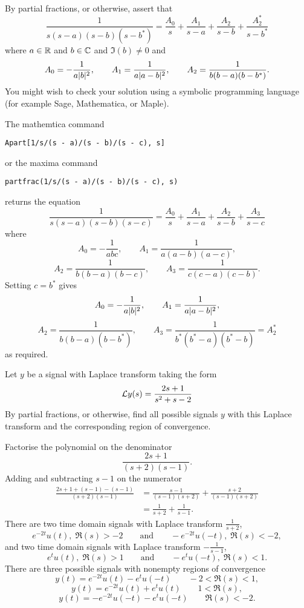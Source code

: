 \begin{excersizelist}
\begin{hardexercise}

\item \label{exer:partialfracfourthorder} By partial fractions, or otherwise, assert that
\[
\frac{1}{s(s-a)(s-b)(s-b^*)} = \frac{A_0}{s} + \frac{A_1}{s-a} + \frac{A_2}{s-b} + \frac{A_2^*}{s-b^*}
\]
where $a \in {\mathbb R}$ and $b \in {\mathbb C}$ and $\Im(b) \neq 0$ and
\[
A_0 = -\frac{1}{a\vert b \vert^2}, \qquad A_1 =  \frac{1}{a\vert a - b \vert^2}, \qquad A_2 = \frac{1}{b(b-a)(b-b^*)}.
\]
You might wish to check your solution using a symbolic programming language (for example Sage, Mathematica, or Maple).
\begin{solution}
The mathemtica command
\begin{verbatim}
Apart[1/s/(s - a)/(s - b)/(s - c), s]
\end{verbatim}
or the maxima command
\begin{verbatim}
partfrac(1/s/(s - a)/(s - b)/(s - c), s)
\end{verbatim}
returns the equation
\[
\frac{1}{s(s-a)(s-b)(s-c)} = \frac{A_0}{s} + \frac{A_1}{s-a} + \frac{A_2}{s-b} + \frac{A_3}{s-c}
\]
where
\[
A_0 = -\frac{1}{abc}, \qquad A_1 =  \frac{1}{a (a-b) (a-c)}, 
\]
\[
A_2 = \frac{1}{b (b-a) (b-c)}, \qquad A_3 = \frac{1}{c (c-a) (c-b)}.
\]
Setting $c = b^*$ gives
\[
A_0 = -\frac{1}{a\vert b \vert^2}, \qquad A_1 =  \frac{1}{a\vert a - b \vert^2}, 
\]
\[ 
A_2 = \frac{1}{b(b-a)(b-b^*)}, \qquad A_3 = \frac{1}{b^*(b^*-a)(b^*-b)} = A_2^*
\]
as required.
\end{solution}

\end{hardexercise}

\item Let $y$ be a signal with Laplace transform taking the form
\[
\mathcal L y(s) = \frac{2s + 1}{s^2 + s - 2}
\]
By partial fractions, or otherwise, find all possible signals $y$ with this Laplace transform and the corresponding region of convergence. 
\begin{solution}
Factorise the polynomial on the denominator
\[
\frac{2s + 1}{(s+2)(s-1)}.
\]
Adding and subtracting $s-1$ on the numerator 
\begin{align*}
\frac{2s + 1 + (s-1) - (s-1)}{(s+2)(s-1)} &= \frac{s-1}{(s-1)(s+2)} + \frac{s+2}{(s-1)(s+2)} \\
&= \frac{1}{s+2} + \frac{1}{s-1}.
\end{align*}
There are two time domain signals with Laplace transform $\frac{1}{s+2}$,
\[
e^{-2t} u(t), \; \Re(s) > -2 \qquad \text{and} \qquad -e^{-2t}u(-t), \; \Re(s) < -2,
\] 
and two time domain signals with Laplace transform $-\frac{1}{s-1}$,
 \[
e^{t}u(t), \; \Re(s) > 1 \qquad \text{and} \qquad -e^{t} u(-t), \; \Re(s) < 1.
\] 
There are three possible signals with nonempty regions of convergence
\[
y(t) = e^{-2t} u(t) - e^{t} u(-t) \qquad -2 < \Re(s) < 1,
\]
\[
y(t) = e^{-2t} u(t) + e^{t} u(t) \qquad 1 < \Re(s),
\]
\[
y(t) = - e^{-2t} u(-t) - e^{t} u(-t) \qquad \Re(s) < -2.
\]
\end{solution}


\end{excersizelist}
